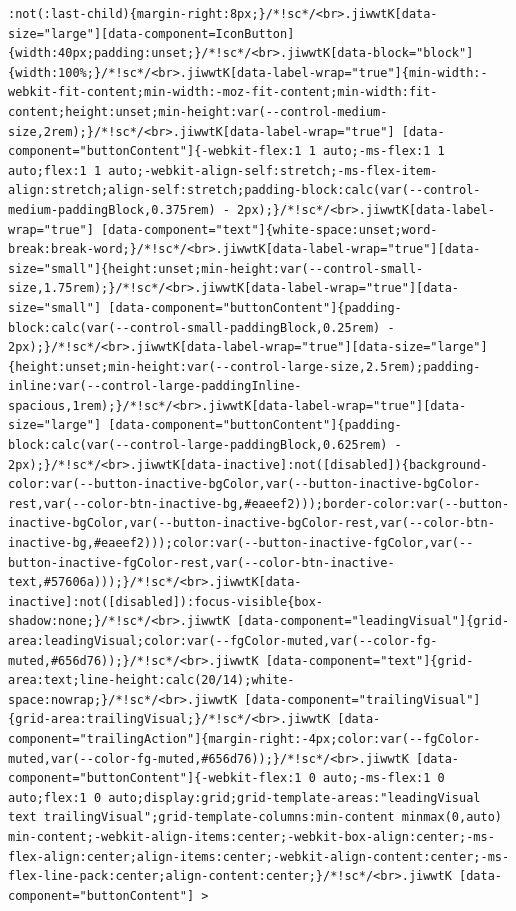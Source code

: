 \documentclass[
  letterpaper,
]{book}
\begin{document}
\begin{verbatim}
:not(:last-child){margin-right:8px;}/*!sc*/<br>.jiwwtK[data-size="large"][data-component=IconButton]{width:40px;padding:unset;}/*!sc*/<br>.jiwwtK[data-block="block"]{width:100%;}/*!sc*/<br>.jiwwtK[data-label-wrap="true"]{min-width:-webkit-fit-content;min-width:-moz-fit-content;min-width:fit-content;height:unset;min-height:var(--control-medium-size,2rem);}/*!sc*/<br>.jiwwtK[data-label-wrap="true"] [data-component="buttonContent"]{-webkit-flex:1 1 auto;-ms-flex:1 1 auto;flex:1 1 auto;-webkit-align-self:stretch;-ms-flex-item-align:stretch;align-self:stretch;padding-block:calc(var(--control-medium-paddingBlock,0.375rem) - 2px);}/*!sc*/<br>.jiwwtK[data-label-wrap="true"] [data-component="text"]{white-space:unset;word-break:break-word;}/*!sc*/<br>.jiwwtK[data-label-wrap="true"][data-size="small"]{height:unset;min-height:var(--control-small-size,1.75rem);}/*!sc*/<br>.jiwwtK[data-label-wrap="true"][data-size="small"] [data-component="buttonContent"]{padding-block:calc(var(--control-small-paddingBlock,0.25rem) - 2px);}/*!sc*/<br>.jiwwtK[data-label-wrap="true"][data-size="large"]{height:unset;min-height:var(--control-large-size,2.5rem);padding-inline:var(--control-large-paddingInline-spacious,1rem);}/*!sc*/<br>.jiwwtK[data-label-wrap="true"][data-size="large"] [data-component="buttonContent"]{padding-block:calc(var(--control-large-paddingBlock,0.625rem) - 2px);}/*!sc*/<br>.jiwwtK[data-inactive]:not([disabled]){background-color:var(--button-inactive-bgColor,var(--button-inactive-bgColor-rest,var(--color-btn-inactive-bg,#eaeef2)));border-color:var(--button-inactive-bgColor,var(--button-inactive-bgColor-rest,var(--color-btn-inactive-bg,#eaeef2)));color:var(--button-inactive-fgColor,var(--button-inactive-fgColor-rest,var(--color-btn-inactive-text,#57606a)));}/*!sc*/<br>.jiwwtK[data-inactive]:not([disabled]):focus-visible{box-shadow:none;}/*!sc*/<br>.jiwwtK [data-component="leadingVisual"]{grid-area:leadingVisual;color:var(--fgColor-muted,var(--color-fg-muted,#656d76));}/*!sc*/<br>.jiwwtK [data-component="text"]{grid-area:text;line-height:calc(20/14);white-space:nowrap;}/*!sc*/<br>.jiwwtK [data-component="trailingVisual"]{grid-area:trailingVisual;}/*!sc*/<br>.jiwwtK [data-component="trailingAction"]{margin-right:-4px;color:var(--fgColor-muted,var(--color-fg-muted,#656d76));}/*!sc*/<br>.jiwwtK [data-component="buttonContent"]{-webkit-flex:1 0 auto;-ms-flex:1 0 auto;flex:1 0 auto;display:grid;grid-template-areas:"leadingVisual text trailingVisual";grid-template-columns:min-content minmax(0,auto) min-content;-webkit-align-items:center;-webkit-box-align:center;-ms-flex-align:center;align-items:center;-webkit-align-content:center;-ms-flex-line-pack:center;align-content:center;}/*!sc*/<br>.jiwwtK [data-component="buttonContent"] > 
\end{verbatim}
\end{document}
